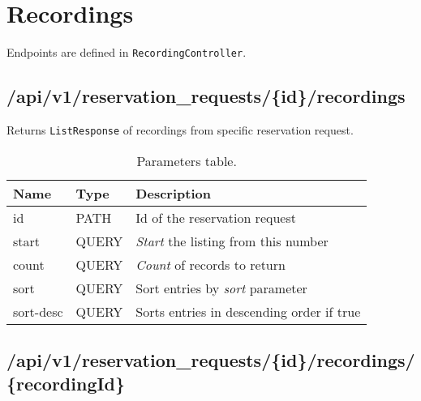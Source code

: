 \section{Recordings}
Endpoints are defined in \texttt{RecordingController}.
\subsection{/api/v1/reservation\_requests/\{id\}/recordings}
Returns \texttt{ListResponse} of recordings from specific reservation request.
\begin{table}[ht!]
    \begin{tabularx}{\textwidth}{llX}
        \toprule
        Name & Type & Description \\
        \midrule
        id & PATH & Id of the reservation request \\ 
        start & QUERY & \emph{Start} the listing from this number \\  
        count & QUERY & \emph{Count} of records to return \\
        sort & QUERY & Sort entries by \emph{sort} parameter \\
        sort-desc & QUERY & Sorts entries in descending order if true \\
        \bottomrule
        \end{tabularx}
    \caption{Parameters table.}
\end{table}
\subsection{/api/v1/reservation\_requests/\{id\}/recordings/\{recordingId\}}
